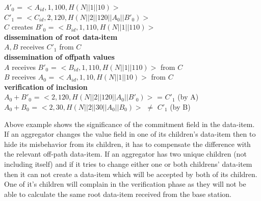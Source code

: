 \begin{exmp}
\begin{itemize}
		$A'_{0}$ = $<A_{id},1,100, H(N||1||10)>$\\
		$C'_{1}$ = $<C_{id},2,120, H(N||2||120||A_{0}||B'_{0})>$\\
		$C$ creates $B'_{0}$ = $<B_{id},1,110, H(N||1||110)>$\\
		\textbf{dissemination of root data-item}\\
			$A,B$ receives $C'_{1}$ from $C$\\
		\textbf{dissemination of offpath values}\\
			$A$ receives $B'_{0}$ = $<B_{id},1,110, H(N||1||110)>$ from $C$\\
			$B$ receives $A_{0}$ = $<A_{id},1,10,H(N||1||10)>$ from $C$\\
		\textbf{verification of inclusion}\\
			$A_{0}+B'_{0}$ = $<2,120,H(N||2||120||A_{0}||B'_{0})>$ = $C'_{1}$ (by A)\\
			$A_{0}+B_{0}$ = $<2,30,H(N||2||30||A_{0}||B_{0})>$ $\neq$ $C'_{1} $ (by B)
	\end{itemize}
	\end{exmp}
Above example shows the significance of the commitment field in the data-item.
If an aggregator changes the value field in one of its children's data-item then to hide its misbehavior from its children, it has to compensate the difference with the relevant off-path data-item. 
If an aggregator has two unique children (not including itself) and if it tries to change either one or both childrens' data-item then it can not create a data-item which will be accepted by both of its children.
One of it's children will complain in the verification phase as they will not be able to calculate the same root data-item received from the base station.

	
  
  

